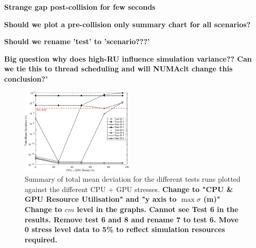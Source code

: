 \documentclass[letterpaper, 10 pt, journal, twoside]{IEEEtran}
\begin{document}
\textbf{Strange gap post-collision for few seconds}

\textbf{Should we plot a pre-collision only summary chart for all scenarios?}

\textbf{Should we rename 'test' to 'scenario???'}

\textbf{Big question why does high-RU influence simulation variance?? Can we tie this to thread scheduling and will NUMAclt change this conclusion?'}



\begin{figure}[!t]
    \centering
    \includegraphics[width=0.48\textwidth]{Other/Figures/ExperimentsStressSummary.pdf}
    \caption{Summary of total mean deviation for the different tests runs plotted against the different CPU + GPU stresses.\textbf{ Change to "CPU \& GPU Resource Utilisation" and "y axis to $\max\sigma$ (m)" Change to $cm$ level in the graphs. Cannot see Test 6 in the results. Remove test 6 and 8 and rename 7 to test 6. Move 0 stress level data to 5\% to reflect simulation resources required.}}

    \label{ExperimentsStressSummary}
\end{figure}
\end{document}
